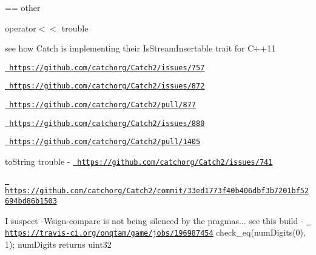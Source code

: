 == other
\begin{DoxyItemize}
\item operator$<$$<$ trouble
\begin{DoxyItemize}
\item see how Catch is implementing their Is\+Stream\+Insertable trait for C++11
\item \href{https://github.com/catchorg/Catch2/issues/757}{\texttt{ https\+://github.\+com/catchorg/\+Catch2/issues/757}}
\item \href{https://github.com/catchorg/Catch2/issues/872}{\texttt{ https\+://github.\+com/catchorg/\+Catch2/issues/872}}
\item \href{https://github.com/catchorg/Catch2/pull/877}{\texttt{ https\+://github.\+com/catchorg/\+Catch2/pull/877}}
\item \href{https://github.com/catchorg/Catch2/issues/880}{\texttt{ https\+://github.\+com/catchorg/\+Catch2/issues/880}}
\item \href{https://github.com/catchorg/Catch2/pull/1405}{\texttt{ https\+://github.\+com/catchorg/\+Catch2/pull/1405}}
\end{DoxyItemize}
\item to\+String trouble -\/ \href{https://github.com/catchorg/Catch2/issues/741}{\texttt{ https\+://github.\+com/catchorg/\+Catch2/issues/741}}
\item \href{https://github.com/catchorg/Catch2/commit/33ed1773f40b406dbf3b7201bf52694bd86b1503}{\texttt{ https\+://github.\+com/catchorg/\+Catch2/commit/33ed1773f40b406dbf3b7201bf52694bd86b1503}}
\item I suspect -\/Wsign-\/compare is not being silenced by the pragmas... see this build -\/ \href{https://travis-ci.org/onqtam/game/jobs/196987454}{\texttt{ https\+://travis-\/ci.\+org/onqtam/game/jobs/196987454}} check\+\_\+eq(num\+Digits(0), 1); num\+Digits returns uint32 
\end{DoxyItemize}